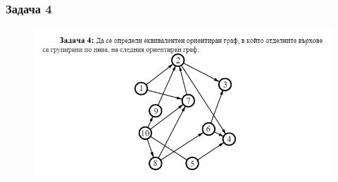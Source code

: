 \documentclass[fleqn, 12pt]{article}
\theoremstyle{definition}
\begin{document}
\newpage
\subsubsection*{Задача 4}
\begin{figure} [htp!]
\includegraphics[width = \linewidth]{Pics/Discrete math/ex8/ex8-task4.png}
\end{figure}
\end{document}
